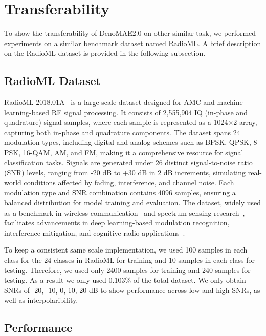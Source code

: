 \section{Transferability}

To show the transferability of DenoMAE2.0 on other similar task, we performed experiments on a similar benchmark dataset named RadioML. A brief description on the RadioML dataset is provided in the following subsection.

\subsection{RadioML Dataset}

RadioML 2018.01A~\cite{o2018over} is a large-scale dataset designed for AMC and machine learning-based RF signal processing. It consists of 2,555,904 IQ (in-phase and quadrature) signal samples, where each sample is represented as a 1024×2 array, capturing both in-phase and quadrature components. The dataset spans 24 modulation types, including digital and analog schemes such as BPSK, QPSK, 8-PSK, 16-QAM, AM, and FM, making it a comprehensive resource for signal classification tasks. Signals are generated under 26 distinct signal-to-noise ratio (SNR) levels, ranging from -20 dB to +30 dB in 2 dB increments, simulating real-world conditions affected by fading, interference, and channel noise. Each modulation type and SNR combination contains 4096 samples, ensuring a balanced distribution for model training and evaluation. The dataset, widely used as a benchmark in wireless communication~\cite{ccamlibel2024automatic} and spectrum sensing research~\cite{elyousseph2021deep}, facilitates advancements in deep learning-based modulation recognition, interference mitigation, and cognitive radio applications~\cite{cheng2024automatic, jagatheesaperumal2024deep, 10014805}.

To keep a consistent same scale implementation, we used 100 samples in each class for the 24 classes in RadioML for training and 10 samples in each class for testing. Therefore, we used only 2400 samples for training and 240 samples for testing. As a result we only used 0.103\% of the total dataset. We only obtain SNRs of -20, -10, 0, 10, 20 dB to show performance across low and high SNRs, as well as interpolaribility. 

\subsection{Performance}

